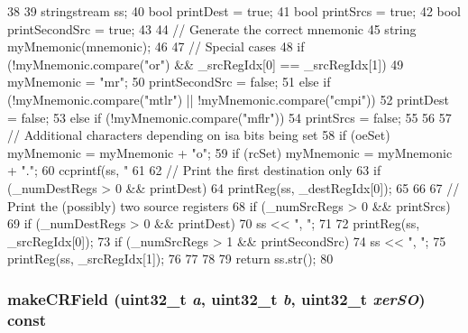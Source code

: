 \begin{DoxyCode}
38 {
39     stringstream ss;
40     bool printDest = true;
41     bool printSrcs = true;
42     bool printSecondSrc = true;
43 
44     // Generate the correct mnemonic
45     string myMnemonic(mnemonic);
46 
47     // Special cases
48     if (!myMnemonic.compare("or") && _srcRegIdx[0] == _srcRegIdx[1]) {
49         myMnemonic = "mr";
50         printSecondSrc = false;
51     } else if (!myMnemonic.compare("mtlr") || !myMnemonic.compare("cmpi")) {
52         printDest = false;
53     } else if (!myMnemonic.compare("mflr")) {
54         printSrcs = false;
55     }
56 
57     // Additional characters depending on isa bits being set
58     if (oeSet) myMnemonic = myMnemonic + "o";
59     if (rcSet) myMnemonic = myMnemonic + ".";
60     ccprintf(ss, "%
61 
62     // Print the first destination only
63     if (_numDestRegs > 0 && printDest) {
64         printReg(ss, _destRegIdx[0]);
65     }
66 
67     // Print the (possibly) two source registers
68     if (_numSrcRegs > 0 && printSrcs) {
69         if (_numDestRegs > 0 && printDest) {
70             ss << ", ";
71         }
72         printReg(ss, _srcRegIdx[0]);
73         if (_numSrcRegs > 1 && printSecondSrc) {
74           ss << ", ";
75           printReg(ss, _srcRegIdx[1]);
76         }
77     }
78 
79     return ss.str();
80 }
\end{DoxyCode}
\hypertarget{classPowerISA_1_1IntOp_a10abff1d629ec03bbdffbe7eb03c1b77}{
\subsubsection[{makeCRField}]{ makeCRField ({\bf uint32\_\-t} {\em a}, \/  {\bf uint32\_\-t} {\em b}, \/  {\bf uint32\_\-t} {\em xerSO}) const}}
\label{classPowerISA_1_1IntOp_a10abff1d629ec03bbdffbe7eb03c1b77}



